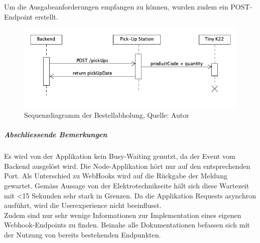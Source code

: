 Um die Ausgabeanforderungen empfangen zu können, wurden zudem ein POST-Endpoint erstellt. 
\begin{figure}[H]
	\centering
	\includegraphics[width=1\textwidth]{images/orderPickUp.PNG}
	\caption[Sequenzdiagramm der Bestellabholung]{Sequenzdiagramm der Bestellabholung, Quelle: Autor}
	\label{img: stationBackendCom}
\end{figure} 
\subparagraph{Abschliessende Bemerkungen}
Es wird von der Applikation kein Busy-Waiting genutzt, da der Event vom Backend ausgelöst wird. Die Node-Applikation hört nur auf den entsprechenden Port. 
Als Unterschied zu \gls{WebHooks} wird auf die Rückgabe der Meldung gewartet. Gemäss Aussage von der Elektrotechnikseite hält sich diese Wartezeit mit <15 Sekunden sehr stark in Grenzen. Da die Applikation Requests asynchron ausführt, wird die Userexperience nicht beeinflusst.\\
Zudem sind nur sehr wenige Informationen zur Implementation eines eigenen Webhook-Endpoints zu finden. Beinahe alle Dokumentationen befassen sich mit der Nutzung von bereits bestehenden Endpunkten. 

